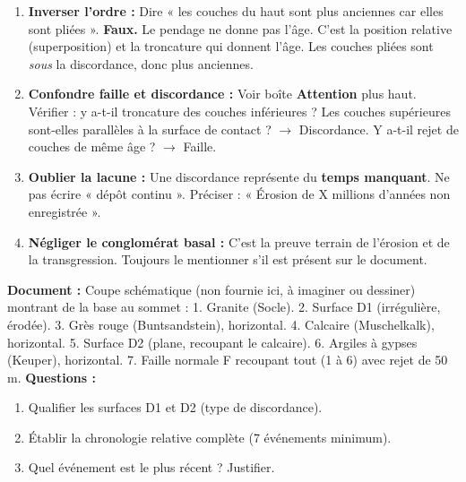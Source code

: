 \documentclass[11pt]{article}
\begin{document}
\begin{attention}
\begin{enumerate}
    \item \textbf{Inverser l'ordre :} Dire « les couches du haut sont plus anciennes car elles sont pliées ». \textbf{Faux.} Le pendage ne donne pas l'âge. C'est la position relative (superposition) et la troncature qui donnent l'âge. Les couches pliées sont \emph{sous} la discordance, donc plus anciennes.
    \item \textbf{Confondre faille et discordance :} Voir boîte \textbf{Attention} plus haut. Vérifier : y a-t-il troncature des couches inférieures ? Les couches supérieures sont-elles parallèles à la surface de contact ? $\rightarrow$ Discordance. Y a-t-il rejet de couches de même âge ? $\rightarrow$ Faille.
    \item \textbf{Oublier la lacune :} Une discordance représente du \textbf{temps manquant}. Ne pas écrire « dépôt continu ». Préciser : « Érosion de X millions d'années non enregistrée ».
    \item \textbf{Négliger le conglomérat basal :} C'est la preuve terrain de l'érosion et de la transgression. Toujours le mentionner s'il est présent sur le document.
\end{enumerate}
\end{attention}

\begin{exercice}
\textbf{Document :} Coupe schématique (non fournie ici, à imaginer ou dessiner) montrant de la base au sommet :
1. Granite (Socle).
2. Surface D1 (irrégulière, érodée).
3. Grès rouge (Buntsandstein), horizontal.
4. Calcaire (Muschelkalk), horizontal.
5. Surface D2 (plane, recoupant le calcaire).
6. Argiles à gypses (Keuper), horizontal.
7. Faille normale F recoupant tout (1 à 6) avec rejet de 50 m.
\textbf{Questions :}
\begin{enumerate}
    \item Qualifier les surfaces D1 et D2 (type de discordance).
    \item Établir la chronologie relative complète (7 événements minimum).
    \item Quel événement est le plus récent ? Justifier.
\end{enumerate}
\end{exercice}
\end{document}
